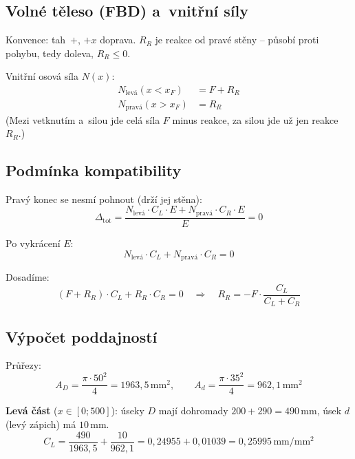 \documentclass[a4paper,11pt]{article}
\newcommand{\unit}[1]{\,\mathrm{#1}}
\begin{document}
\subsection{Volné těleso (FBD) a~vnitřní síly}

Konvence: tah~$+$, $+x$ doprava. $R_R$ je reakce od pravé stěny -- působí proti pohybu, tedy doleva, $R_R \le 0$.

Vnitřní osová síla $N(x)$:
\begin{align}
N_{\mathrm{levá}}(x < x_F) &= F + R_R \\
N_{\mathrm{pravá}}(x > x_F) &= R_R
\end{align}
(Mezi vetknutím a~silou jde celá síla $F$ minus reakce, za silou jde už jen reakce $R_R$.)

\subsection{Podmínka kompatibility}

Pravý konec se nesmí pohnout (drží jej stěna):
\begin{equation}
\Delta_{\mathrm{tot}} = \frac{N_{\mathrm{levá}}\cdot C_L\cdot E + N_{\mathrm{pravá}}\cdot C_R\cdot E}{E} = 0
\end{equation}

Po vykrácení $E$:
\begin{equation}
N_{\mathrm{levá}}\cdot C_L + N_{\mathrm{pravá}}\cdot C_R = 0
\end{equation}

Dosadíme:
\begin{equation}
(F + R_R)\cdot C_L + R_R\cdot C_R = 0 \quad\Rightarrow\quad \boxed{R_R = -F\cdot \frac{C_L}{C_L + C_R}}
\end{equation}

\subsection{Výpočet poddajností}

Průřezy:
\begin{equation}
A_D = \frac{\pi\cdot 50^2}{4} = 1963{,}5\unit{mm^2},\qquad A_d = \frac{\pi\cdot 35^2}{4} = 962{,}1\unit{mm^2}
\end{equation}

\textbf{Levá část} ($x \in [0; 500]$): úseky $D$ mají dohromady $200 + 290 = 490\unit{mm}$, úsek $d$ (levý zápich) má $10\unit{mm}$.
\begin{equation}
C_L = \frac{490}{1963{,}5} + \frac{10}{962{,}1} = 0{,}24955 + 0{,}01039 = 0{,}25995\unit{mm/mm^2}
\end{equation}
\end{document}
